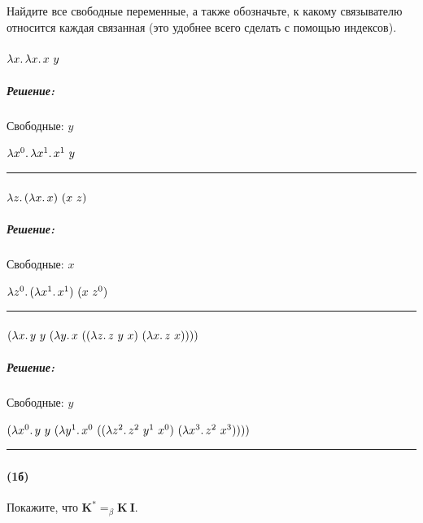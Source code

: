 \documentclass{article}
\newenvironment{proof}{\subparagraph{\hspace{-1em}Решение:\newline}\-}{\par\noindent\rule{\textwidth}{0.4pt}}
\newcommand{\comb}[1]{\mathbf{#1}}
\newcommand{\eqbeta}{=_\beta}
\begin{document}
    Найдите все свободные переменные, а также обозначьте, к какому связывателю относится каждая связанная (это удобнее всего сделать с помощью индексов).

    \paragraph{}

    $\lambda x \ldotp \lambda x \ldotp x~y$

    \begin{proof}
         Свободные: \(y\)

        \(\lambda x^0\ldotp \lambda x^1\ldotp x^1~y\)
    \end{proof}

    \paragraph{}

    $\lambda z \ldotp (\lambda x \ldotp x)~(x~z)$

    \begin{proof}
         Свободные: \(x\)

        \(\lambda z^0 \ldotp (\lambda x^1 \ldotp x^1)~(x~z^0)\)
    \end{proof}

    \paragraph{}

    $(\lambda x\ldotp y~y~(\lambda y\ldotp x~((\lambda z\ldotp z~y~x)~(\lambda x\ldotp z~x))))$

    \begin{proof}
         Свободные: \(y\)

        \((\lambda x^0\ldotp y~y~(\lambda y^1\ldotp x^0~((\lambda z^2\ldotp z^2~y^1~x^0)~(\lambda x^3\ldotp z^2~x^3))))\)
    \end{proof}

    \subsubsection{}

    \paragraph{(1б)}

    Покажите, что $\comb{K}^* \eqbeta \comb{K}~\comb{I}$.
\end{document}
